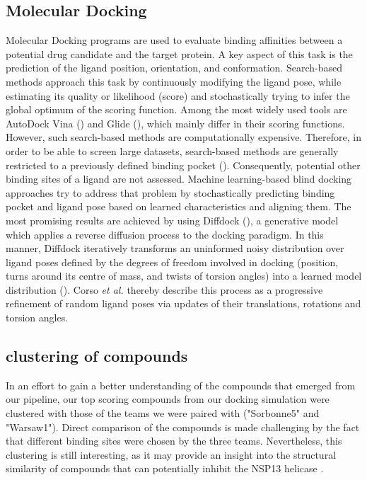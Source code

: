 \documentclass[11pt, letterpaper, titlepage]{article}
\begin{document}
\subsection{Molecular Docking}
Molecular Docking programs are used to evaluate binding affinities between a potential drug candidate and the target protein. A key aspect of this task is the prediction of the ligand position, orientation, and conformation. Search-based methods approach this task by continuously modifying the ligand pose, while estimating its quality or likelihood (score) and stochastically trying to infer the global optimum of the scoring function. Among the most widely used tools are AutoDock Vina (\cite{Trott.2010}) and Glide (\cite{Halgren.2004}), which mainly differ in their scoring functions. However, such search-based methods are computationally expensive. Therefore, in order to be able to screen large datasets, search-based methods are generally restricted to a previously defined binding pocket (\cite{Corso.2022}). Consequently, potential other binding sites of a ligand are not assessed. Machine learning-based blind docking approaches try to address that problem by stochastically predicting binding pocket and ligand pose based on learned characteristics and aligning them. The most promising results are achieved by using Diffdock (\cite{Corso.2022}), a generative model which applies a reverse diffusion process to the docking paradigm. In this manner, Diffdock iteratively transforms an uninformed noisy distribution over ligand poses defined by the degrees of freedom involved in docking (position, turns around its centre of mass, and twists of torsion angles) into a learned model distribution (\cite{Corso.2022}). Corso \textit{et al.} thereby describe this process as a progressive refinement of random ligand poses via updates of their translations, rotations and torsion angles.

\subsection{clustering of compounds}
In an effort to gain a better understanding of the compounds that emerged from our pipeline, our top scoring compounds from our docking simulation were clustered with those of the teams we were paired with ("Sorbonne5" and "Warsaw1"). Direct comparison of the compounds is made challenging by the fact that different binding sites were chosen by the three teams. Nevertheless, this clustering is still interesting, as it may provide an insight into the structural similarity of compounds that can potentially inhibit the \ac{NSP13} helicase \cite{Spratt_2021}.
\end{document}
